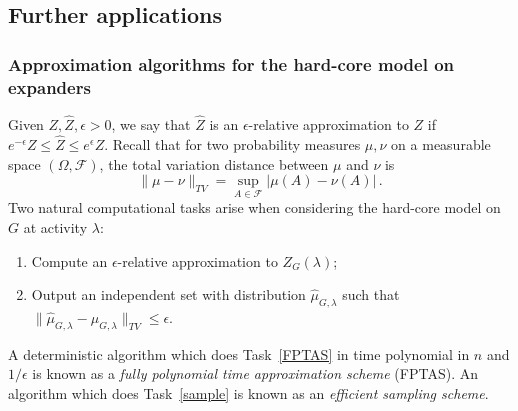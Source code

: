 \documentclass[a4paper]{amsart}
\theoremstyle{definition}
\newcommand{\eps}{\epsilon}
\newcommand{\0}[0]{\emptyset}
\newcommand{\lam}{\lambda}
\begin{document}
\subsection{Further applications}\label{subsec:furtherapp}

\subsubsection*{Approximation algorithms for the hard-core model on expanders}
Given $Z,\hat Z, \epsilon>0$, we say that $\hat Z$ is an $\epsilon$-relative approximation to $Z$ if $ e^{-\eps} Z \leq \hat Z \leq  e^{\eps} Z$. Recall that for two probability measures $\mu, \nu$ on a measurable space $(\Omega,\mathcal{F})$, the total variation distance between $\mu$ and $\nu$ is
\[
\|\mu- \nu\|_{TV}= \sup_{A\in \mathcal{F}}|\mu(A)-\nu(A)|\, .
\]
Two natural computational tasks arise when considering the hard-core model on $G$ at activity $\lam$:
\begin{enumerate}
\item  Compute an $\epsilon$-relative approximation to $Z_G(\lam)$; \label{FPTAS}
\item Output an independent set with distribution $\hat \mu_{G,\lam}$ such that $\|\hat \mu_{G,\lam}- \mu_{G,\lam}\|_{TV}\leq \eps$.\label{sample}
\end{enumerate}
A deterministic algorithm which does Task~\ref{FPTAS} in time polynomial in $n$ and $1/\eps$ is known as a \emph{fully polynomial time approximation scheme} (FPTAS).
An algorithm which does Task~\ref{sample} is known as an \emph{efficient sampling scheme}.
\end{document}
